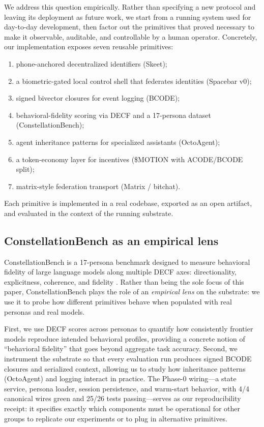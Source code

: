 We address this question empirically. Rather than specifying a new protocol
and leaving its deployment as future work, we start from a running system used
for day-to-day development, then factor out the primitives that proved necessary
to make it observable, auditable, and controllable by a human operator.
Concretely, our implementation exposes seven reusable primitives:
\begin{enumerate}
  \item phone-anchored decentralized identifiers (Skeet);
  \item a biometric-gated local control shell that federates identities
        (Spacebar v0);
  \item signed bivector closures for event logging (BCODE);
  \item behavioral-fidelity scoring via DECF and a 17-persona dataset
        (ConstellationBench);
  \item agent inheritance patterns for specialized assistants (OctoAgent);
  \item a token-economy layer for incentives (\$MOTION with ACODE/BCODE split);
  \item matrix-style federation transport (Matrix / bitchat).
\end{enumerate}
Each primitive is implemented in a real codebase, exported as an open artifact,
and evaluated in the context of the running substrate.

\subsection{ConstellationBench as an empirical lens}

ConstellationBench is a 17-persona benchmark designed to measure
behavioral fidelity of large language models along multiple DECF axes:
directionality, explicitness, coherence, and fidelity \cite{constellationbench}.
Rather than being the sole focus of this paper, ConstellationBench plays the
role of an \emph{empirical lens} on the substrate: we use it to probe how
different primitives behave when populated with real personas and real models.

First, we use DECF scores across personas to quantify how consistently
frontier models reproduce intended behavioral profiles, providing a concrete
notion of ``behavioral fidelity'' that goes beyond aggregate task accuracy.
Second, we instrument the substrate so that every evaluation run produces
signed BCODE closures and serialized context, allowing us to study how
inheritance patterns (OctoAgent) and logging interact in practice.
The Phase-0 wiring---a state service, persona loader, session persistence, and
warm-start behavior, with 4/4 canonical wires green and 25/26 tests passing---serves
as our reproducibility receipt: it specifies exactly which components must be
operational for other groups to replicate our experiments or to plug in
alternative primitives.

